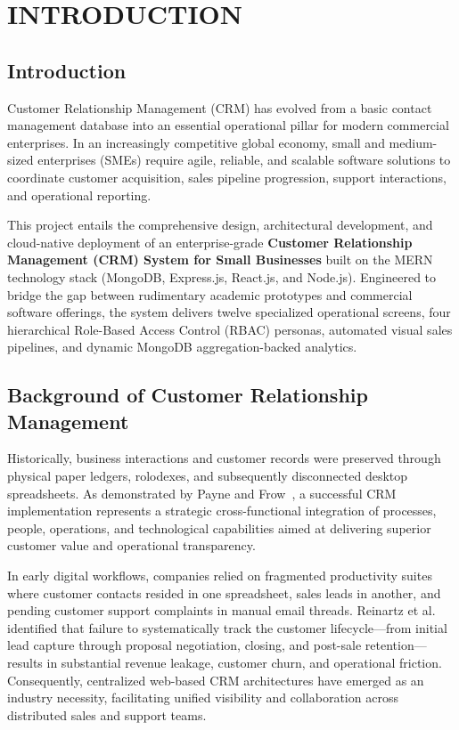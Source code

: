 \chapter{INTRODUCTION}

\section{Introduction}
Customer Relationship Management (CRM) has evolved from a basic contact management database into an essential operational pillar for modern commercial enterprises. In an increasingly competitive global economy, small and medium-sized enterprises (SMEs) require agile, reliable, and scalable software solutions to coordinate customer acquisition, sales pipeline progression, support interactions, and operational reporting. 

This project entails the comprehensive design, architectural development, and cloud-native deployment of an enterprise-grade \textbf{Customer Relationship Management (CRM) System for Small Businesses} built on the MERN technology stack (MongoDB, Express.js, React.js, and Node.js). Engineered to bridge the gap between rudimentary academic prototypes and commercial software offerings, the system delivers twelve specialized operational screens, four hierarchical Role-Based Access Control (RBAC) personas, automated visual sales pipelines, and dynamic MongoDB aggregation-backed analytics.

\section{Background of Customer Relationship Management}
Historically, business interactions and customer records were preserved through physical paper ledgers, rolodexes, and subsequently disconnected desktop spreadsheets. As demonstrated by Payne and Frow~\cite{payne2005strategic}, a successful CRM implementation represents a strategic cross-functional integration of processes, people, operations, and technological capabilities aimed at delivering superior customer value and operational transparency.

In early digital workflows, companies relied on fragmented productivity suites where customer contacts resided in one spreadsheet, sales leads in another, and pending customer support complaints in manual email threads. Reinartz et al.~\cite{reinartz2004customer} identified that failure to systematically track the customer lifecycle—from initial lead capture through proposal negotiation, closing, and post-sale retention—results in substantial revenue leakage, customer churn, and operational friction. Consequently, centralized web-based CRM architectures have emerged as an industry necessity, facilitating unified visibility and collaboration across distributed sales and support teams.

